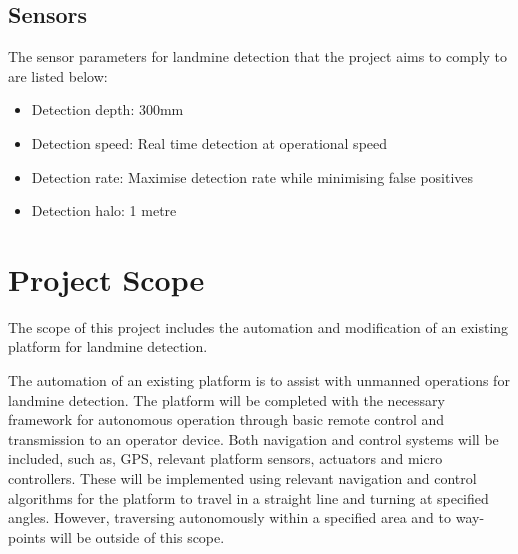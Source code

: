 \documentclass[main.tex]{subfiles}
\begin{document}
\subsection{Sensors}
The sensor parameters for landmine detection that the project aims to comply to are listed below:
\begin{itemize}
\item Detection depth: 300mm 
\item Detection speed: Real time detection at operational speed
\item Detection rate: Maximise detection rate while minimising false positives
\item Detection halo: 1 metre
\end{itemize}

\section{Project Scope}

The scope of this project includes the automation and modification of an existing platform for landmine detection. %

The automation of an existing platform is to assist with unmanned operations for landmine detection. The platform will be completed with the necessary framework for autonomous operation through basic remote control and transmission to an operator device. Both navigation and control systems will be included, such as, GPS, relevant platform sensors, actuators and micro controllers. These will be implemented using relevant navigation and control algorithms for the platform to travel in a straight line and turning at specified angles. However, traversing autonomously within a specified area and to way-points will be outside of this scope. 
\end{document}
